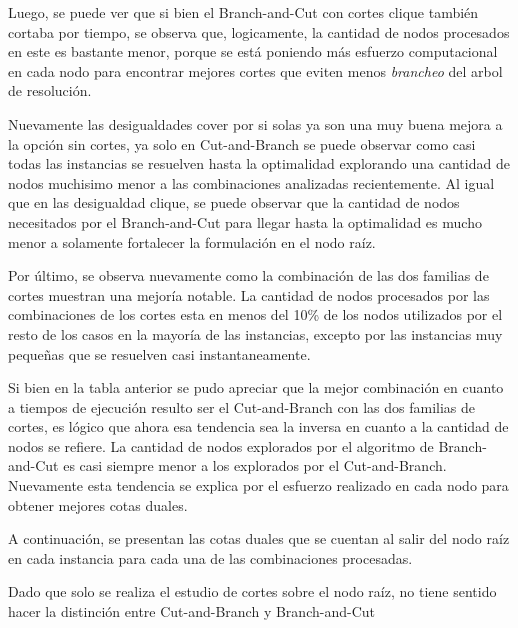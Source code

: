 Luego, se puede ver que si bien el Branch-and-Cut con cortes clique tambi\'en cortaba por tiempo, se observa que, logicamente, la cantidad de nodos procesados en este es bastante menor, porque se est\'a poniendo m\'as esfuerzo computacional en cada nodo para encontrar mejores cortes que eviten menos \emph{brancheo} del arbol de resoluci\'on.



Nuevamente las desigualdades cover por si solas ya son una muy buena mejora a la opci\'on sin cortes, ya solo en Cut-and-Branch se puede observar como casi todas las instancias se resuelven hasta la optimalidad explorando una cantidad de nodos muchisimo menor a las combinaciones analizadas recientemente. Al igual que en las desigualdad clique, se puede observar que la cantidad de nodos necesitados por el Branch-and-Cut para llegar hasta la optimalidad es mucho menor a solamente fortalecer la formulaci\'on en el nodo ra\'iz.


Por \'ultimo, se observa nuevamente como la combinaci\'on de las dos familias de cortes muestran una mejor\'ia notable. La cantidad de nodos procesados por las combinaciones de los cortes esta en menos del 10\% de los nodos utilizados por el resto de los casos en la mayor\'ia de las instancias, excepto por las instancias muy peque\~nas que se resuelven casi instantaneamente.

Si bien en la tabla anterior se pudo apreciar que la mejor combinaci\'on en cuanto a tiempos de ejecuci\'on resulto ser el Cut-and-Branch con las dos familias de cortes, es l\'ogico que ahora esa tendencia sea la inversa en cuanto a la cantidad de nodos se refiere. La cantidad de nodos explorados por el algoritmo de Branch-and-Cut es casi siempre menor a los explorados por el Cut-and-Branch. Nuevamente esta tendencia se explica por el esfuerzo realizado en cada nodo para obtener mejores cotas duales.

\bigskip


A continuaci\'on, se presentan las cotas duales que se cuentan al salir del nodo ra\'iz en cada instancia para cada una de las combinaciones procesadas.

Dado que solo se realiza el estudio de cortes sobre el nodo ra\'iz, no tiene sentido hacer la distinci\'on entre Cut-and-Branch y Branch-and-Cut



